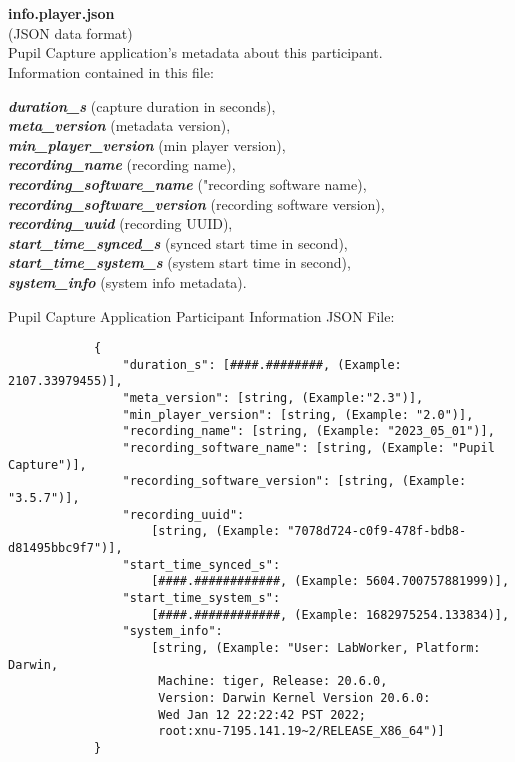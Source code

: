 \begin{description}
\begin{addmargin}[0em]{0em}
    \textbf{\\\\}
    \begin{addmargin}[1em]{0em} %
        \label{info.player.json}
        \textbf{info.player.json}\\(JSON data format)\\
        Pupil Capture application's metadata about this participant.\\
        Information contained in this file:
        \begin{addmargin}[1em]{0em}
            \textbf{\textit{duration\_s}} (capture duration in seconds),\\
            \textbf{\textit{meta\_version}} (metadata version),\\
            \textbf{\textit{min\_player\_version}} (min player version),\\
            \textbf{\textit{recording\_name}} (recording name),\\
            \textbf{\textit{recording\_software\_name}} ("recording software name),\\
            \textbf{\textit{recording\_software\_version}} (recording software version),\\
            \textbf{\textit{recording\_uuid}} (recording UUID),\\
            \textbf{\textit{start\_time\_synced\_s}} (synced start time in second),\\
            \textbf{\textit{start\_time\_system\_s}} (system start time in second),\\
            \textbf{\textit{system\_info}} (system info metadata).
        \end{addmargin}
        Pupil Capture Application Participant Information JSON File:
        \begin{verbatim}
            {
                "duration_s": [####.########, (Example: 2107.33979455)],
                "meta_version": [string, (Example:"2.3")],
                "min_player_version": [string, (Example: "2.0")],
                "recording_name": [string, (Example: "2023_05_01")],
                "recording_software_name": [string, (Example: "Pupil Capture")],
                "recording_software_version": [string, (Example: "3.5.7")],
                "recording_uuid":
                    [string, (Example: "7078d724-c0f9-478f-bdb8-d81495bbc9f7")],
                "start_time_synced_s":
                    [####.############, (Example: 5604.700757881999)],
                "start_time_system_s":
                    [####.############, (Example: 1682975254.133834)],
                "system_info":
                    [string, (Example: "User: LabWorker, Platform: Darwin,
                     Machine: tiger, Release: 20.6.0,
                     Version: Darwin Kernel Version 20.6.0:
                     Wed Jan 12 22:22:42 PST 2022;
                     root:xnu-7195.141.19~2/RELEASE_X86_64")]
            }
        \end{verbatim}
    \end{addmargin} %


\end{addmargin}
\end{description}
